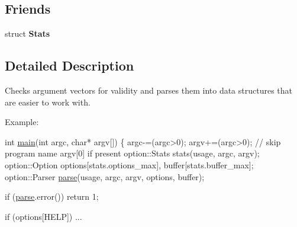 \subsection*{Friends}
\begin{DoxyCompactItemize}
\item 
\hypertarget{classxmem_1_1config_1_1third__party_1_1_parser_a7183dc3501d1c87153f9c0d41f869460}{struct {\bfseries Stats}}\label{classxmem_1_1config_1_1third__party_1_1_parser_a7183dc3501d1c87153f9c0d41f869460}

\end{DoxyCompactItemize}


\subsection{Detailed Description}
Checks argument vectors for validity and parses them into data structures that are easier to work with. 

\begin{DoxyParagraph}{Example\-:}

\begin{DoxyCode}
\textcolor{keywordtype}{int} \hyperlink{main_8cpp_a0ddf1224851353fc92bfbff6f499fa97}{main}(\textcolor{keywordtype}{int} argc, \textcolor{keywordtype}{char}* argv[])
\{
  argc-=(argc>0); argv+=(argc>0); \textcolor{comment}{// skip program name argv[0] if present}
  option::Stats  stats(usage, argc, argv);
  option::Option options[stats.options\_max], buffer[stats.buffer\_max];
  option::Parser \hyperlink{classxmem_1_1config_1_1third__party_1_1_parser_a0e45d97675bc5d003ef6f68ac8cd7249}{parse}(usage, argc, argv, options, buffer);

  \textcolor{keywordflow}{if} (\hyperlink{classxmem_1_1config_1_1third__party_1_1_parser_a0e45d97675bc5d003ef6f68ac8cd7249}{parse}.error())
    \textcolor{keywordflow}{return} 1;

  \textcolor{keywordflow}{if} (options[HELP])
  ...
\end{DoxyCode}
 
\end{DoxyParagraph}


